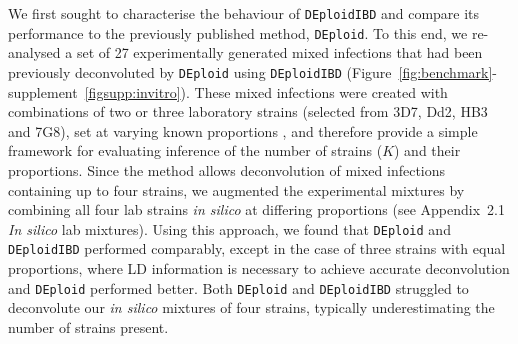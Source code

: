 \documentclass[9pt,lineno]{elife}
\begin{document}
We first sought to characterise the behaviour of \texttt{DEploidIBD} and compare its performance to the previously published method, \texttt{DEploid}.  To this end, we re-analysed a set of 27 experimentally generated mixed infections \citep{Wendler2015} that had been previously deconvoluted by \texttt{DEploid} \citep{Zhu2017} using \texttt{DEploidIBD} (Figure~\ref*{fig:benchmark}-supplement~\ref*{figsupp:invitro}). These mixed infections were created with combinations of two or three laboratory strains (selected from 3D7, Dd2, HB3 and 7G8), set at varying known proportions \citep{Wendler2015}, and therefore provide a simple framework for evaluating inference of the number of strains ($K$) and their proportions. Since the method allows deconvolution of mixed infections containing up to four strains, we augmented the experimental mixtures by combining all four lab strains {\it in silico} at differing proportions (see Appendix~2.1 {\it In silico} lab mixtures). Using this approach, we found that \texttt{DEploid} and \texttt{DEploidIBD} performed comparably, except in the case of three strains with equal proportions, where LD information is necessary to achieve accurate deconvolution and \texttt{DEploid} performed better. Both \texttt{DEploid} and \texttt{DEploidIBD} struggled to deconvolute our {\it in silico} mixtures of four strains, typically underestimating the number of strains present.
\end{document}
